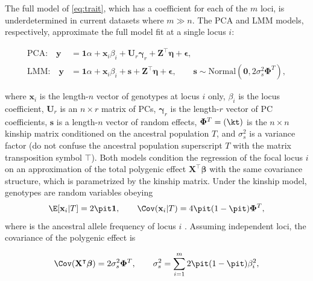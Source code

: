 \documentclass[11pt]{article}
\begin{document}
\begin{linenumbers}
The full model of \cref{eq:trait}, which has a coefficient for each of the $m$ loci, is underdetermined in current datasets where $m \gg n$.
The PCA and LMM models, respectively, approximate the full model fit at a single locus $i$:
\begin{linenomath*}
\begin{align}
  \label{eq:pca_gwas}
  \text{PCA:}\quad
  \mathbf{y}
  &=
    \mathbf{1} \alpha + \mathbf{x}_i \beta_i + \mathbf{U}_r \boldsymbol{\gamma}_r + \mathbf{Z}^\intercal \boldsymbol{\eta} + \boldsymbol{\epsilon}
    , \\
  \label{eq:lmm_gwas}
  \text{LMM:}\quad
  \mathbf{y}
  &=
    \mathbf{1} \alpha + \mathbf{x}_i \beta_i + \mathbf{s} + \mathbf{Z}^\intercal \boldsymbol{\eta} + \boldsymbol{\epsilon}
    ,
    \quad\quad
    \mathbf{s} \sim \text{Normal} \left( \mathbf{0}, 2 \sigma^2_s \mathbf{\Phi}^T \right),
\end{align}
\end{linenomath*}
where $\mathbf{x}_i$ is the length-$n$ vector of genotypes at locus $i$ only,
$\beta_i$ is the locus coefficient,
$\mathbf{U}_r$ is an $n \times r$ matrix of PCs,
$\boldsymbol{\gamma}_r$ is the length-$r$ vector of PC coefficients,
$\mathbf{s}$ is a length-$n$ vector of random effects,
$\mathbf{\Phi}^T = (\kt)$ is the $n \times n$ kinship matrix conditioned on the ancestral population $T$,
and $\sigma^2_s$ is a variance factor (do not confuse the ancestral population superscript $T$ with the matrix transposition symbol $\intercal$).
Both models condition the regression of the focal locus $i$ on an approximation of the total polygenic effect $\mathbf{X}^\intercal \boldsymbol{\beta}$ with the same covariance structure, which is parametrized by the kinship matrix.
Under the kinship model, genotypes are random variables obeying
\begin{equation}
  \label{eq:kinship_model}
  \E[ \mathbf{x}_i | T ]
  =
  2 \pit \mathbf{1},
  \quad\quad
  \Cov( \mathbf{x}_i | T )
  =
  4 \pit ( 1 - \pit ) \mathbf{\Phi}^T,
\end{equation}
where \pit is the ancestral allele frequency of locus $i$ \citep{malecot_mathematiques_1948, wright_genetical_1949, jacquard_structures_1970, astle_population_2009}.
Assuming independent loci, the covariance of the polygenic effect is
\begin{linenomath*}
$$
\Cov( \mathbf{X}^\intercal \boldsymbol{\beta} ) = 2 \sigma^2_s \mathbf{\Phi}^T,
\quad\quad
\sigma^2_s = \sum_{i=1}^m 2 \pit ( 1 - \pit ) \beta_i^2,
$$
\end{linenomath*}

\end{linenumbers}
\end{document}
